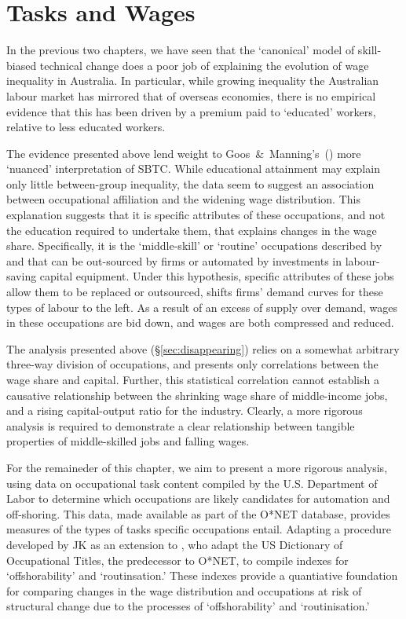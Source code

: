 
\section{Tasks and Wages}

In the previous two chapters, we have seen that the `canonical' model of skill-biased technical change does a poor job of explaining the evolution of wage inequality in Australia. In particular, while growing inequality the Australian labour market has mirrored that of overseas economies, there is no empirical evidence that this has been driven by a premium paid to `educated' workers, relative to less educated workers. 

The evidence presented above lend weight to Goos~\&~Manning's~(\citeyear{Goos2007}) more `nuanced' interpretation of SBTC. While educational attainment may explain only little between-group inequality, the data seem to suggest an association between occupational affiliation and the widening wage distribution. This explanation suggests that it is specific attributes of these occupations, and not the education required to undertake them, that explains changes in the wage share. Specifically, it is the `middle-skill' or `routine' occupations described by \citet{Levy2003} and \citet{Goos2009} that can be out-sourced by firms or automated by investments in labour-saving capital equipment. Under this hypothesis, specific attributes of these jobs allow them to be replaced or outsourced, shifts firms' demand curves for these types of labour to the left. As a result of an excess of supply over demand, wages in these occupations are bid down, and wages are both compressed and reduced. 

The analysis presented above (\S\ref{sec:disappearing}) relies on a somewhat arbitrary three-way division of occupations, and presents only correlations between the wage share and capital. Further, this statistical correlation cannot establish a causative relationship between the shrinking wage share of middle-income jobs, and a rising capital-output ratio for the industry. Clearly, a more rigorous analysis is required to demonstrate a clear relationship between tangible properties of middle-skilled jobs and falling wages.

For the remaineder of this chapter, we aim to present a more rigorous analysis, using data on occupational task content compiled by the U.S. Department of Labor to determine which occupations are likely candidates for automation and off-shoring. This data, made available as part of the O*NET database, provides measures of the types of tasks specific occupations entail. Adapting a procedure developed by JK as an extension to \citet{Levy2003}, who adapt the US Dictionary of Occupational Titles, the predecessor to O*NET, to compile indexes for `offshorability' and `routinsation.' These indexes provide a quantiative foundation for comparing changes in the wage distribution and occupations at risk of structural change due to the processes of `offshorability' and `routinisation.'

